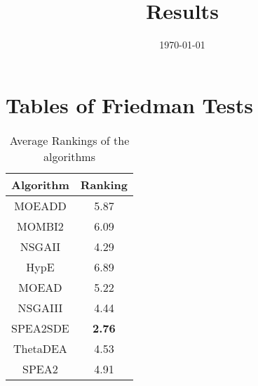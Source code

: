 \documentclass{article}
\title{Results}
\author{}
\date{\today}
\begin{document}
\oddsidemargin 0in \topmargin 0in\maketitle
\section{Tables of Friedman Tests}
\begin{table}[!htp]
\centering
\caption{Average Rankings of the algorithms
}\begin{tabular}{|c|c|}
\hline
Algorithm&Ranking\\
\hline
MOEADD&5.87\\\hline
MOMBI2&6.09\\\hline
NSGAII&4.29\\\hline
HypE&6.89\\\hline
MOEAD&5.22\\\hline
NSGAIII&4.44\\\hline
SPEA2SDE& {\bf 2.76}\\\hline
ThetaDEA&4.53\\\hline
SPEA2&4.91\\\hline
\end{tabular}
\end{table}
\end{document}
